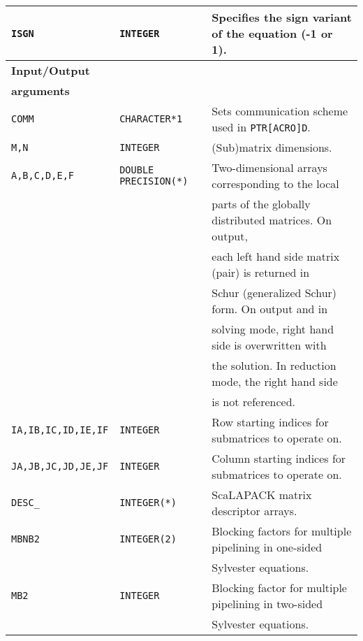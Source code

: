 \documentclass[11pt]{article}
\begin{document}
\begin{table}[!htb]
\begin{tabular}{|l|l|l|}
\texttt{ISGN} & \texttt{INTEGER} & Specifies the sign variant of
the equation (-1 or 1). \\ \hline

{\bf Input/Output} & & \\
{\bf arguments}   & & \\ \hline

 \texttt{COMM} & \texttt{CHARACTER*1} & Sets communication scheme used
 in \texttt{PTR[ACRO]D}. \\

\texttt{M,N} & \texttt{INTEGER} & (Sub)matrix dimensions. \\


\texttt{A,B,C,D,E,F}  & \texttt{DOUBLE PRECISION(*)} &  Two-dimensional arrays corresponding to the local   \\
                      &                              &  parts of the globally distributed matrices. On output,    \\
                 &                                   &  each left hand side matrix (pair) is returned in    \\
                 &                                   &  Schur (generalized Schur) form. On output and in \\
                 &                                   &  solving mode, right hand side is overwritten with \\
                 &                                   &  the solution. In reduction mode, the right hand side \\
                 &                                   &  is not referenced. \\

\texttt{IA,IB,IC,ID,IE,IF} & \texttt{INTEGER} & Row starting
indices for submatrices to
operate on. \\

\texttt{JA,JB,JC,JD,JE,JF} & \texttt{INTEGER} & Column starting
indices for submatrices
to operate on. \\

\texttt{DESC\_} & \texttt{INTEGER(*)} & ScaLAPACK matrix
descriptor arrays. \\

\texttt{MBNB2} & \texttt{INTEGER(2)} & Blocking factors
for multiple pipelining in one-sided  \\
 &   & Sylvester equations. \\

\texttt{MB2} & \texttt{INTEGER} & Blocking factor for multiple pipelining in two-sided  \\
 &  &  Sylvester equations. \\


\end{tabular}
\end{table}
\end{document}
